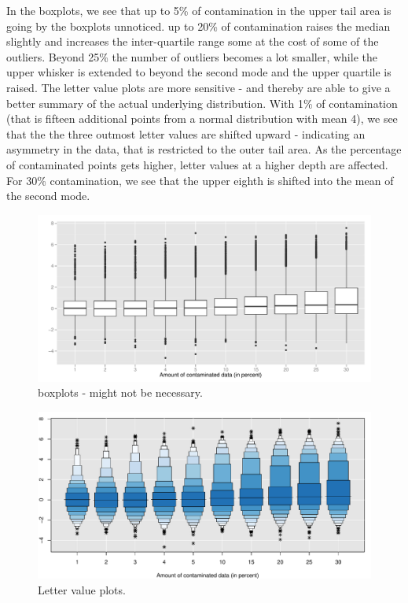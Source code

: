 \documentclass[12pt,oneside]{article}
\begin{document}
In the boxplots, we see that up to 5\% of contamination in the upper tail area is going by the boxplots unnoticed.  up to 20\% of contamination raises the median slightly and increases the inter-quartile range some at the cost of some of the outliers. Beyond 25\% the number of outliers becomes a lot smaller, while the upper whisker is extended to beyond the second mode and the upper quartile is raised. 
The letter value plots are more sensitive - and thereby are able to give a better summary of the actual underlying distribution.
With 1\% of contamination (that is fifteen additional points from a normal distribution with mean 4), we see that the the three outmost letter values are shifted upward - indicating an asymmetry in the data, that is restricted to the outer tail area. As the percentage of contaminated points gets higher, letter values at a higher depth are affected. For 30\% contamination, we see that the upper eighth is shifted into the mean of the second mode. 
\begin{figure}[htbp] %
   \centering
   \includegraphics[width=.8\textwidth]{xpl-boxplot} 
   \caption{boxplots - might not be necessary.}
   \label{fig:xpl:boxplot}
\end{figure}

\begin{figure}[htbp] %
   \centering
   \includegraphics[width=.8\textwidth]{xpl-lvplot} 
   \caption{Letter value plots.}
   \label{fig:xpl:lvplot}
\end{figure}
\end{document}
